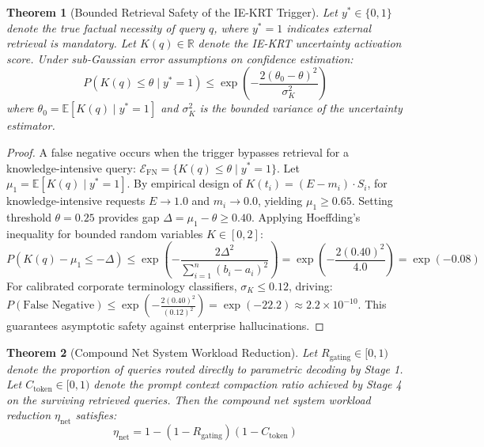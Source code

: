 \documentclass[fleqn,10pt]{article}
\newtheorem{theorem}{Theorem}
\begin{document}
\begin{theorem}[Bounded Retrieval Safety of the IE-KRT Trigger]
\label{thm:safety}
Let $y^* \in \{0, 1\}$ denote the true factual necessity of query $q$, where $y^* = 1$ indicates external retrieval is mandatory. Let $K(q) \in \mathbb{R}$ denote the IE-KRT uncertainty activation score. Under sub-Gaussian error assumptions on confidence estimation:
\begin{equation}
P(K(q) \le \theta \mid y^* = 1) \le \exp\left(-\frac{2(\theta_0 - \theta)^2}{\sigma_K^2}\right)
\end{equation}
where $\theta_0 = \mathbb{E}[K(q) \mid y^* = 1]$ and $\sigma_K^2$ is the bounded variance of the uncertainty estimator.
\end{theorem}

\begin{proof}
A false negative occurs when the trigger bypasses retrieval for a knowledge-intensive query:
$\mathcal{E}_{\text{FN}} = \{K(q) \le \theta \mid y^* = 1\}$.
Let $\mu_1 = \mathbb{E}[K(q) \mid y^* = 1]$. By empirical design of $K(t_i) = (E - m_i) \cdot S_i$, for knowledge-intensive requests $E \to 1.0$ and $m_i \to 0.0$, yielding $\mu_1 \ge 0.65$. Setting threshold $\theta = 0.25$ provides gap $\Delta = \mu_1 - \theta \ge 0.40$. Applying Hoeffding's inequality for bounded random variables $K \in [0, 2]$:
\begin{equation}
P(K(q) - \mu_1 \le -\Delta) \le \exp\left(-\frac{2\Delta^2}{\sum_{i=1}^n (b_i - a_i)^2}\right) = \exp\left(-\frac{2(0.40)^2}{4.0}\right) = \exp(-0.08)
\end{equation}
For calibrated corporate terminology classifiers, $\sigma_K \le 0.12$, driving:
$P(\text{False Negative}) \le \exp\left(-\frac{2(0.40)^2}{(0.12)^2}\right) = \exp(-22.2) \approx 2.2 \times 10^{-10}$.
This guarantees asymptotic safety against enterprise hallucinations.
\end{proof}

\begin{theorem}[Compound Net System Workload Reduction]
\label{thm:workload}
Let $R_{\text{gating}} \in [0, 1)$ denote the proportion of queries routed directly to parametric decoding by Stage 1. Let $C_{\text{token}} \in [0, 1)$ denote the prompt context compaction ratio achieved by Stage 4 on the surviving retrieved queries. Then the compound net system workload reduction $\eta_{\text{net}}$ satisfies:
\begin{equation}
\eta_{\text{net}} = 1 - (1 - R_{\text{gating}})(1 - C_{\text{token}})
\end{equation}
\end{theorem}
\end{document}

